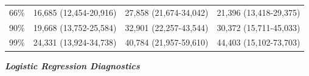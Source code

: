 \documentclass[
]{article}
\begin{document}
\begin{longtable}[]{@{}llll@{}}
\begin{minipage}[t]{0.17\columnwidth}
66\%\strut
\end{minipage} & \begin{minipage}[t]{0.22\columnwidth}\raggedright
16,685 (12,454-20,916)\strut
\end{minipage} & \begin{minipage}[t]{0.22\columnwidth}\raggedright
27,858 (21,674-34,042)\strut
\end{minipage} & \begin{minipage}[t]{0.22\columnwidth}\raggedright
21,396 (13,418-29,375)\strut
\end{minipage}\tabularnewline
\begin{minipage}[t]{0.17\columnwidth}\raggedright
90\%\strut
\end{minipage} & \begin{minipage}[t]{0.22\columnwidth}\raggedright
19,668 (13,752-25,584)\strut
\end{minipage} & \begin{minipage}[t]{0.22\columnwidth}\raggedright
32,901 (22,257-43,544)\strut
\end{minipage} & \begin{minipage}[t]{0.22\columnwidth}\raggedright
30,372 (15,711-45,033)\strut
\end{minipage}\tabularnewline
\begin{minipage}[t]{0.17\columnwidth}\raggedright
99\%\strut
\end{minipage} & \begin{minipage}[t]{0.22\columnwidth}\raggedright
24,331 (13,924-34,738)\strut
\end{minipage} & \begin{minipage}[t]{0.22\columnwidth}\raggedright
40,784 (21,957-59,610)\strut
\end{minipage} & \begin{minipage}[t]{0.22\columnwidth}\raggedright
44,403 (15,102-73,703)\strut
\end{minipage}\tabularnewline
\bottomrule
\end{longtable}

\textbf{\emph{Logistic Regression Diagnostics}}
\end{document}
